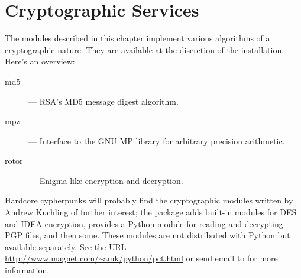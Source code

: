 \chapter{Cryptographic Services}
\label{crypto}

The modules described in this chapter implement various algorithms of
a cryptographic nature.  They are available at the discretion of the
installation.  Here's an overview:

\begin{description}

\item[md5]
--- RSA's MD5 message digest algorithm.

\item[mpz]
--- Interface to the GNU MP library for arbitrary precision arithmetic.

\item[rotor]
--- Enigma-like encryption and decryption.

\end{description}

Hardcore cypherpunks will probably find the cryptographic modules
written by Andrew Kuchling of further interest; the package adds
built-in modules for DES and IDEA encryption, provides a Python module
for reading and decrypting PGP files, and then some.  These modules
are not distributed with Python but available separately.  See the URL
\url{http://www.magnet.com/\~amk/python/pct.html} or send email to
 for more information.
